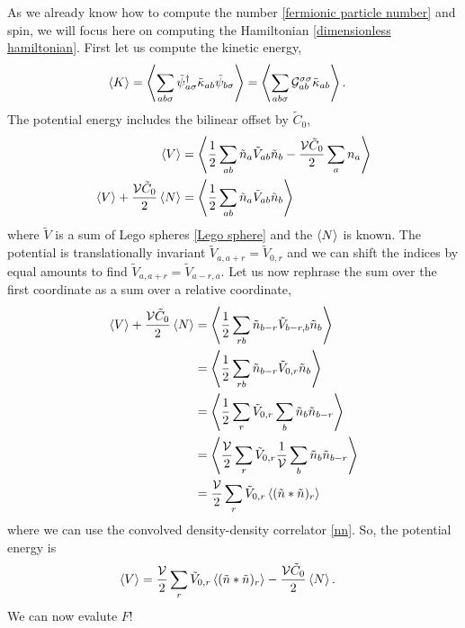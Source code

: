 As we already know how to compute the number \eqref{fermionic particle number} and spin, we will focus here on computing the Hamiltonian \eqref{dimensionless hamiltonian}.
First let us compute the kinetic energy,
\begin{align}
	\left\langle K \right\rangle
	&=
	\left\langle  \sum_{ab\sigma} \tilde{\psi}{}^{\dagger}_{a\sigma} \tilde{\kappa}_{ab} \tilde{\psi}_{b\sigma}  \right\rangle
	=
	\left\langle  \sum_{ab\sigma} \mathcal{G}^{\sigma \sigma}_{ab} \tilde{\kappa}_{ab}  \right\rangle.
\end{align}
The potential energy includes the bilinear offset by $\tilde{C}_0$,
\begin{align}
	\left\langle V \right\rangle
	&=
	\left\langle  \frac{1}{2} \sum_{ab} \tilde{n}_a \tilde{V}_{ab} \tilde{n}_b - \frac{\mathcal{V} \tilde{C}_0}{2}\sum_{a} n_a  \right\rangle
	\nonumber\\
	\left\langle V \right\rangle
	+ \frac{\mathcal{V} \tilde{C}_0}{2} \left\langle N \right\rangle
	&=
	\left\langle  \frac{1}{2} \sum_{ab} \tilde{n}_a \tilde{V}_{ab} \tilde{n}_b  \right\rangle
\end{align}
where $\tilde{V}$ is a sum of Lego spheres \eqref{Lego sphere} and the $\left\langle N \right\rangle$ is known.
The potential is translationally invariant $\tilde{V}_{a,a+r} = \tilde{V}_{0,r}$ and we can shift the indices by equal amounts to find $\tilde{V}_{a,a+r}=\tilde{V}_{a-r,a}$.
Let us now rephrase the sum over the first coordinate as a sum over a relative coordinate,
\begin{align}
	\left\langle V \right\rangle
	+ \frac{\mathcal{V} \tilde{C}_0}{2} \left\langle N \right\rangle
	&=
	\left\langle  \frac{1}{2} \sum_{rb} \tilde{n}_{b-r} \tilde{V}_{b-r,b} \tilde{n}_b  \right\rangle
	\nonumber\\
	&=
	\left\langle  \frac{1}{2} \sum_{rb} \tilde{n}_{b-r} \tilde{V}_{0,r} \tilde{n}_b  \right\rangle
	\nonumber\\
	&=
	\left\langle  \frac{1}{2} \sum_{r} \tilde{V}_{0,r} \sum_b \tilde{n}_b \tilde{n}_{b-r}  \right\rangle
	\nonumber\\
	&=
	\left\langle  \frac{\mathcal{V}}{2} \sum_{r} \tilde{V}_{0,r} \frac{1}{\mathcal{V}} \sum_b \tilde{n}_b \tilde{n}_{b-r}  \right\rangle
	\nonumber\\
	&=
	\frac{\mathcal{V}}{2} \sum_{r} \tilde{V}_{0,r} \left\langle  (\tilde{n}*\tilde{n})_r  \right\rangle
\end{align}
where we can use the convolved density-density correlator \eqref{nn}.
So, the potential energy is
\begin{align}
	\left\langle V \right\rangle
	&=
	\frac{\mathcal{V}}{2} \sum_{r} \tilde{V}_{0,r} \left\langle  (\tilde{n}*\tilde{n})_r  \right\rangle
	- \frac{\mathcal{V} \tilde{C}_0}{2} \left\langle N \right\rangle.
\end{align}
We can now evalute $F$!
